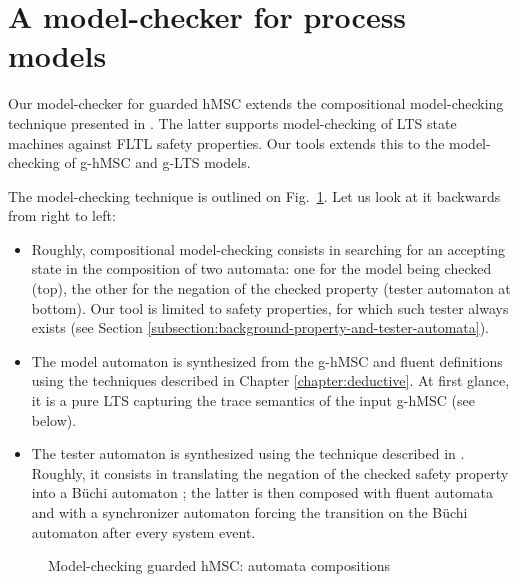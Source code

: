 \section{A model-checker for process models\label{section:tool-model-checker}}

Our model-checker for guarded hMSC extends the compositional model-checking technique presented in \cite{Giannakopoulou:2003}. The latter supports model-checking of LTS state machines against FLTL safety properties. Our tools extends this to the model-checking of g-hMSC and g-LTS models. 

The model-checking technique is outlined on Fig.~\ref{image:model-checking-technique}. Let us look at it backwards from right to left:
\begin{itemize}
\item Roughly, compositional model-checking consists in searching for an accepting state in the composition of two automata: one for the model being checked (top), the other for the negation of the checked property (tester automaton at bottom). Our tool is limited to safety properties, for which such tester always exists (see Section \ref{subsection:background-property-and-tester-automata}).
\item The model automaton is synthesized from the g-hMSC and fluent definitions using the techniques described in Chapter \ref{chapter:deductive}. At first glance, it is a pure LTS capturing the trace semantics of the input g-hMSC (see below).
\item The tester automaton is synthesized using the technique described in \cite{Giannakopoulou:2003}. Roughly, it consists in translating the negation of the checked safety property into a B\"uchi automaton \cite{Giannakopoulou:2002}; the latter is then composed with fluent automata and with a synchronizer automaton forcing the transition on the B\"uchi automaton after every system event. 
\end{itemize} 

\begin{figure}
\centering{}
  \caption{Model-checking guarded hMSC: automata compositions\label{image:model-checking-technique}}
\end{figure}

